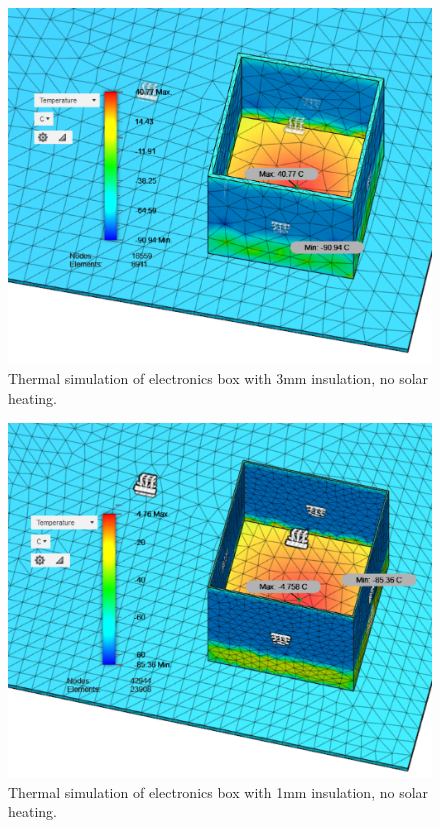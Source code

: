 	\begin{figure}[h!]
    \centering    	
    \includegraphics[scale=0.6]{4-experiment-design/img/mechanical/3mmthicknoheat.PNG}
	\caption{Thermal simulation of electronics box with 3mm insulation, no solar heating.}
	\label{fig:3mmthicknoheat}
	\end{figure}

	\begin{figure}[h!]
    \centering  
    \includegraphics[scale=0.65]{4-experiment-design/img/mechanical/1mmthicknoheat.PNG}
	\caption{Thermal simulation of electronics box with 1mm insulation, no solar heating.}
	\label{fig:1mmthicknoheat}    
    	\end{figure}
	
